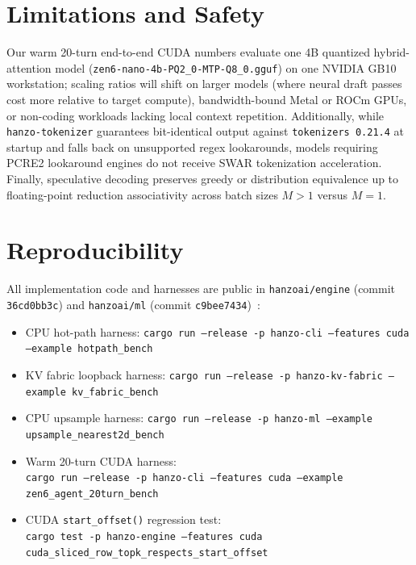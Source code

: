 \documentclass[11pt,a4paper]{article}
\begin{document}
\section{Limitations and Safety}
Our warm 20-turn end-to-end CUDA numbers evaluate one 4B quantized hybrid-attention model (\texttt{zen6-nano-4b-PQ2\_0-MTP-Q8\_0.gguf}) on one NVIDIA GB10 workstation; scaling ratios will shift on larger models (where neural draft passes cost more relative to target compute), bandwidth-bound Metal or ROCm GPUs, or non-coding workloads lacking local context repetition. Additionally, while \texttt{hanzo-tokenizer} guarantees bit-identical output against \texttt{tokenizers 0.21.4} at startup and falls back on unsupported regex lookarounds, models requiring PCRE2 lookaround engines do not receive SWAR tokenization acceleration. Finally, speculative decoding preserves greedy or distribution equivalence up to floating-point reduction associativity across batch sizes $M>1$ versus $M=1$.

\section{Reproducibility}
All implementation code and harnesses are public in \texttt{hanzoai/engine} (commit \texttt{36cd0bb3c}) and \texttt{hanzoai/ml} (commit \texttt{c9bee7434})~\cite{hanzo2026engine}:
\begin{itemize}[noitemsep]
  \item CPU hot-path harness: \texttt{cargo run --release -p hanzo-cli --features cuda --example hotpath\_bench}
  \item KV fabric loopback harness: \texttt{cargo run --release -p hanzo-kv-fabric --example kv\_fabric\_bench}
  \item CPU upsample harness: \texttt{cargo run --release -p hanzo-ml --example upsample\_nearest2d\_bench}
  \item Warm 20-turn CUDA harness: \\ \texttt{cargo run --release -p hanzo-cli --features cuda --example zen6\_agent\_20turn\_bench}
  \item CUDA \texttt{start\_offset()} regression test: \\ \texttt{cargo test -p hanzo-engine --features cuda cuda\_sliced\_row\_topk\_respects\_start\_offset}
\end{itemize}



\end{document}
